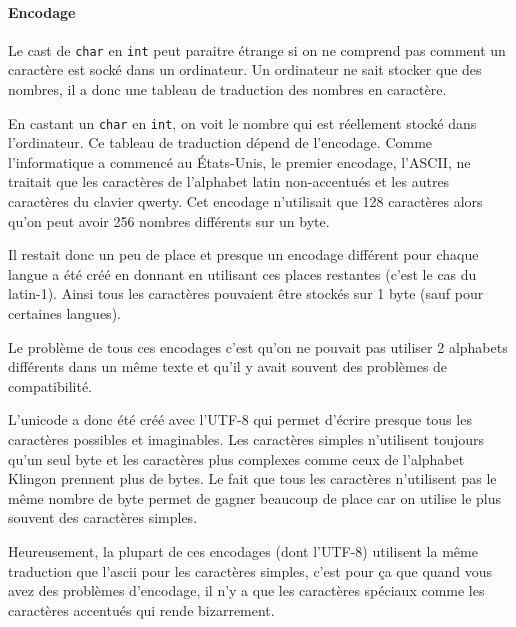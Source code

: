 \paragraph{Encodage}
Le cast de \lstinline|char| en \lstinline|int| peut paraitre
étrange si on ne comprend pas comment
un caractère est socké dans un ordinateur.
Un ordinateur ne sait stocker que des nombres,
il a donc une tableau de traduction des nombres en caractère.

En castant un \lstinline|char| en \lstinline|int|, on voit le nombre
qui est réellement stocké dans l'ordinateur.
Ce tableau de traduction dépend de l'encodage.
Comme l'informatique a commencé au États-Unis,
le premier encodage, l'ASCII, ne traitait que les caractères de l'alphabet
latin non-accentués et les autres caractères du clavier qwerty.
Cet encodage n'utilisait que 128 caractères alors qu'on peut avoir
256 nombres différents sur un byte.

Il restait donc un peu de place et presque un encodage différent
pour chaque langue a été créé en donnant en utilisant ces places restantes
(c'est le cas du latin-1).
Ainsi tous les caractères pouvaient être stockés sur 1 byte
(sauf pour certaines langues).

Le problème de tous ces encodages c'est qu'on ne pouvait pas utiliser
2 alphabets différents dans un même texte et qu'il y avait
souvent des problèmes de compatibilité.

L'unicode a donc été créé avec l'UTF-8 qui permet d'écrire presque
tous les caractères possibles et imaginables.
Les caractères simples n'utilisent toujours qu'un seul byte et les caractères
plus complexes comme ceux de l'alphabet Klingon prennent plus de bytes.
Le fait que tous les caractères n'utilisent pas le même nombre de byte
permet de gagner beaucoup de place car
on utilise le plus souvent des caractères simples.

Heureusement, la plupart de ces encodages (dont l'UTF-8) utilisent
la même traduction que l'ascii pour les caractères simples,
c'est pour ça que quand vous avez des problèmes d'encodage, il n'y a que
les caractères spéciaux comme les caractères accentués qui rende bizarrement.

